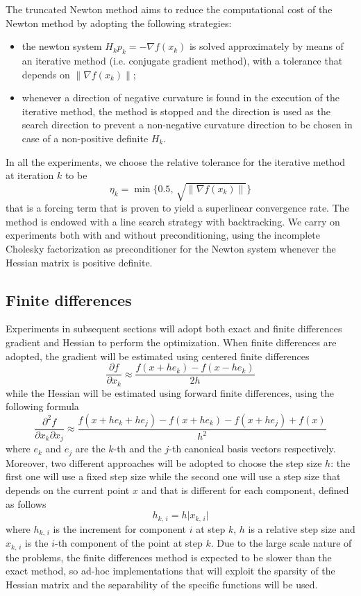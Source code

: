 The truncated Newton method aims to reduce the computational cost of the Newton method by adopting the following strategies:
\begin{itemize}
    \item the newton system $H_k p_k = -\nabla f(x_k)$ is solved approximately by means of an iterative method (i.e. conjugate gradient method), with a tolerance that depends on $\lVert \nabla f(x_k) \rVert$;
    \item whenever a direction of negative curvature is found in the execution of the iterative method, the method is stopped and the direction is used as the search direction to prevent a non-negative curvature direction to be chosen in case of a non-positive definite $H_k$.
\end{itemize}
In all the experiments, we choose the relative tolerance for the iterative method at iteration $k$ to be 
\[
\eta_k = \min\{0.5,\, \sqrt{\lVert \nabla f(x_k) \rVert}\}
\]
that is a forcing term that is proven to yield a superlinear convergence rate.
The method is endowed with a line search strategy with backtracking.
We carry on experiments both with and without preconditioning, using the incomplete Cholesky factorization as preconditioner for the Newton system whenever the Hessian matrix is positive definite.

\subsection{Finite differences}

Experiments in subsequent sections will adopt both exact and finite differences gradient and Hessian to perform the optimization.
When finite differences are adopted, the gradient will be estimated using centered finite differences
\begin{equation}
    \label{eq:findiff_gradient}
    \frac{\partial f}{\partial x_k} \approx \frac{f(x + he_k) - f(x - he_k)}{2h}
\end{equation}
while the Hessian will be estimated using forward finite differences, using the following formula
\begin{equation}
    \label{eq:findiff_hessian}
    \frac{\partial^2 f}{\partial x_k \partial x_j} \approx \frac{f(x + he_k + he_j) - f(x + he_k) - f(x + he_j) + f(x)}{h^2}
\end{equation}
where $e_k$ and $e_j$ are the $k$-th and the $j$-th canonical basis vectors respectively.
Moreover, two different approaches will be adopted to choose the step size $h$: the first one will use a fixed step size while the second one will use a step size that depends on the current point $x$ and that is different for each component, defined as follows
\[
h_{k,\,i} = h \lvert x_{k,\,i} \rvert
\]
where $h_{k,\,i}$ is the increment for component $i$ at step $k$, $h$ is a relative step size and $x_{k,\,i}$ is the $i$-th component of the point at step $k$.
Due to the large scale nature of the problems, the finite differences method is expected to be slower than the exact method, so ad-hoc implementations that will exploit the sparsity of the Hessian matrix and the separability of the specific functions will be used.